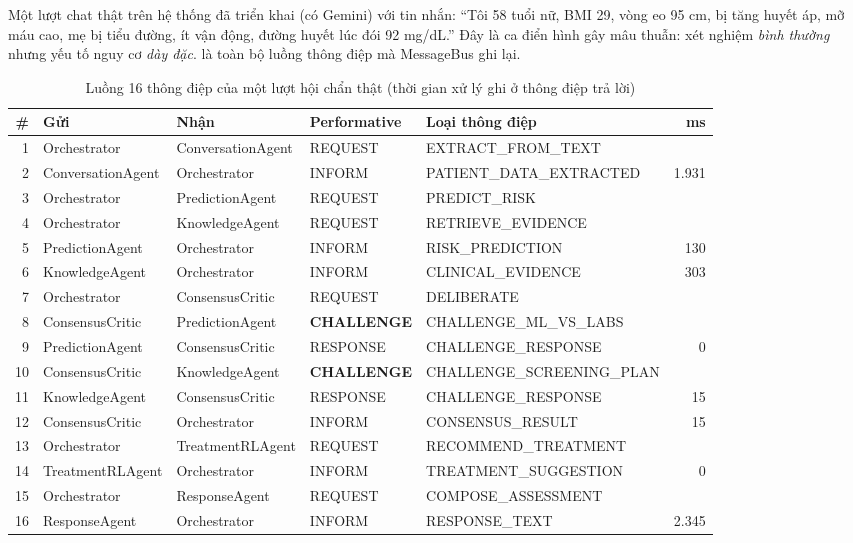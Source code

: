 Một lượt chat thật trên hệ thống đã triển khai (có Gemini) với tin nhắn: ``Tôi 58 tuổi nữ, BMI 29, vòng eo 95 cm, bị tăng huyết áp, mỡ máu cao, mẹ bị tiểu đường, ít vận động, đường huyết lúc đói 92 mg/dL.'' Đây là ca điển hình gây mâu thuẫn: xét nghiệm \emph{bình thường} nhưng yếu tố nguy cơ \emph{dày đặc}.  là toàn bộ luồng thông điệp mà MessageBus ghi lại.

\begin{table}[H]
\centering
\caption{Luồng 16 thông điệp của một lượt hội chẩn thật (thời gian xử lý ghi ở thông điệp trả lời)}
\label{tab:transcript}
\small
\begin{adjustbox}{max width=\linewidth}
\begin{tabular}{@{}rllllr@{}}
\toprule
\textbf{\#} & \textbf{Gửi} & \textbf{Nhận} & \textbf{Performative} & \textbf{Loại thông điệp} & \textbf{ms} \\
\midrule
1 & Orchestrator & ConversationAgent & REQUEST & EXTRACT\_FROM\_TEXT & \\
2 & ConversationAgent & Orchestrator & INFORM & PATIENT\_DATA\_EXTRACTED & 1.931 \\
3 & Orchestrator & PredictionAgent & REQUEST & PREDICT\_RISK & \\
4 & Orchestrator & KnowledgeAgent & REQUEST & RETRIEVE\_EVIDENCE & \\
5 & PredictionAgent & Orchestrator & INFORM & RISK\_PREDICTION & 130 \\
6 & KnowledgeAgent & Orchestrator & INFORM & CLINICAL\_EVIDENCE & 303 \\
7 & Orchestrator & ConsensusCritic & REQUEST & DELIBERATE & \\
8 & ConsensusCritic & PredictionAgent & \textbf{CHALLENGE} & CHALLENGE\_ML\_VS\_LABS & \\
9 & PredictionAgent & ConsensusCritic & RESPONSE & CHALLENGE\_RESPONSE & 0 \\
10 & ConsensusCritic & KnowledgeAgent & \textbf{CHALLENGE} & CHALLENGE\_SCREENING\_PLAN & \\
11 & KnowledgeAgent & ConsensusCritic & RESPONSE & CHALLENGE\_RESPONSE & 15 \\
12 & ConsensusCritic & Orchestrator & INFORM & CONSENSUS\_RESULT & 15 \\
13 & Orchestrator & TreatmentRLAgent & REQUEST & RECOMMEND\_TREATMENT & \\
14 & TreatmentRLAgent & Orchestrator & INFORM & TREATMENT\_SUGGESTION & 0 \\
15 & Orchestrator & ResponseAgent & REQUEST & COMPOSE\_ASSESSMENT & \\
16 & ResponseAgent & Orchestrator & INFORM & RESPONSE\_TEXT & 2.345 \\
\bottomrule
\end{tabular}
\end{adjustbox}
\end{table}

